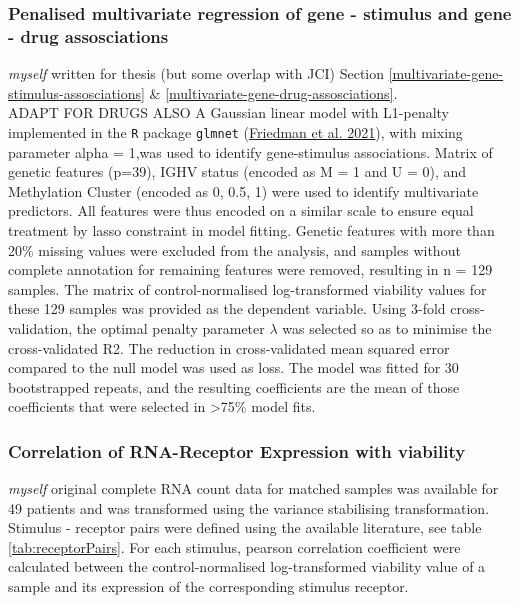 \documentclass[11pt, a4paper, twosided]{book}
\begin{document}
\hypertarget{multivariate-gene-stimulus-assosciations-method}{%
\subsubsection{Penalised multivariate regression of gene - stimulus and gene - drug assosciations}\label{multivariate-gene-stimulus-assosciations-method}}

\emph{myself} written for thesis (but some overlap with JCI)
Section \ref{multivariate-gene-stimulus-assosciations} \& \ref{multivariate-gene-drug-assosciations}.\\
ADAPT FOR DRUGS ALSO A Gaussian linear model with L1-penalty implemented in the \texttt{R} package \texttt{glmnet} (\protect\hyperlink{ref-R-glmnet}{Friedman et al. 2021}), with mixing parameter alpha = 1,was used to identify gene-stimulus associations. Matrix of genetic features (p=39), IGHV status (encoded as M = 1 and U = 0), and Methylation Cluster (encoded as 0, 0.5, 1) were used to identify multivariate predictors. All features were thus encoded on a similar scale to ensure equal treatment by lasso constraint in model fitting. Genetic features with more than 20\% missing values were excluded from the analysis, and samples without complete annotation for remaining features were removed, resulting in n = 129 samples. The matrix of control-normalised log-transformed viability values for these 129 samples was provided as the dependent variable. Using 3-fold cross-validation, the optimal penalty parameter \(\lambda\) was selected so as to minimise the cross-validated R2. The reduction in cross-validated mean squared error compared to the null model was used as loss. The model was fitted for 30 bootstrapped repeats, and the resulting coefficients are the mean of those coefficients that were selected in \textgreater75\% model fits.

\hypertarget{correlation-of-rna-receptor-expression-with-viability}{%
\subsubsection{Correlation of RNA-Receptor Expression with viability}\label{correlation-of-rna-receptor-expression-with-viability}}

\emph{myself} original complete
RNA count data for matched samples was available for 49 patients and was transformed using the variance stabilising transformation. Stimulus - receptor pairs were defined using the available literature, see table \ref{tab:receptorPairs}. For each stimulus, pearson correlation coefficient were calculated between the control-normalised log-transformed viability value of a sample and its expression of the corresponding stimulus receptor.
\end{document}
